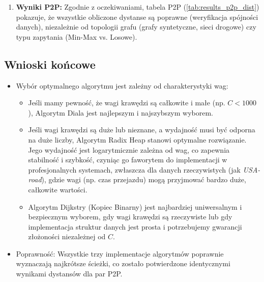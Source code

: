 \documentclass[11pt, a4paper]{article}
\begin{document}
\begin{enumerate}
	\item \textbf{Wyniki P2P:} Zgodnie z oczekiwaniami, tabela P2P (\ref{tab:results_p2p_dist}) pokazuje, że wszystkie obliczone dystanse są poprawne (weryfikacja spójności danych), niezależnie od topologii grafu (grafy syntetyczne, sieci drogowe) czy typu zapytania (Min-Max vs. Losowe).
\end{enumerate}

\subsection{Wnioski końcowe}

\begin{itemize}
	\item Wybór optymalnego algorytmu jest zależny od charakterystyki wag:
	\begin{itemize}
		\item Jeśli mamy pewność, że wagi krawędzi są całkowite i małe (np. $C < 1000$), Algorytm Diala jest najlepszym i najszybszym wyborem.
		\item Jeśli wagi krawędzi są duże lub nieznane, a wydajność musi być odporna na duże liczby, Algorytm Radix Heap stanowi optymalne rozwiązanie. Jego wydajność jest logarytmicznie zależna od wag, co zapewnia stabilność i szybkość, czyniąc go faworytem do implementacji w profesjonalnych systemach, zwłaszcza dla danych rzeczywistych (jak \textit{USA-road}), gdzie wagi (np. czas przejazdu) mogą przyjmować bardzo duże, całkowite wartości.
		\item Algorytm Dijkstry (Kopiec Binarny) jest najbardziej uniwersalnym i bezpiecznym wyborem, gdy wagi krawędzi są rzeczywiste lub gdy implementacja struktur danych jest prosta i potrzebujemy gwarancji złożoności niezależnej od $C$.
	\end{itemize}
	
	\item Poprawność: Wszystkie trzy implementacje algorytmów poprawnie wyznaczają najkrótsze ścieżki, co zostało potwierdzone identycznymi wynikami dystansów dla par P2P.
\end{itemize}

	\clearpage
	
\end{document}
